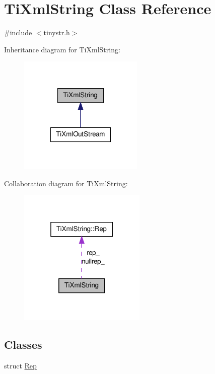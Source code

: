 \hypertarget{classTiXmlString}{
\section{TiXmlString Class Reference}
\label{d1/d15/classTiXmlString}
}


{\ttfamily \#include $<$tinystr.h$>$}



Inheritance diagram for TiXmlString:
\nopagebreak
\begin{figure}[H]
\begin{center}
\leavevmode
\includegraphics[width=168pt]{d8/da2/classTiXmlString__inherit__graph}
\end{center}
\end{figure}


Collaboration diagram for TiXmlString:
\nopagebreak
\begin{figure}[H]
\begin{center}
\leavevmode
\includegraphics[width=172pt]{df/d6f/classTiXmlString__coll__graph}
\end{center}
\end{figure}
\subsection*{Classes}
\begin{DoxyCompactItemize}
\item 
struct \hyperlink{structTiXmlString_1_1Rep}{Rep}
\end{DoxyCompactItemize}
